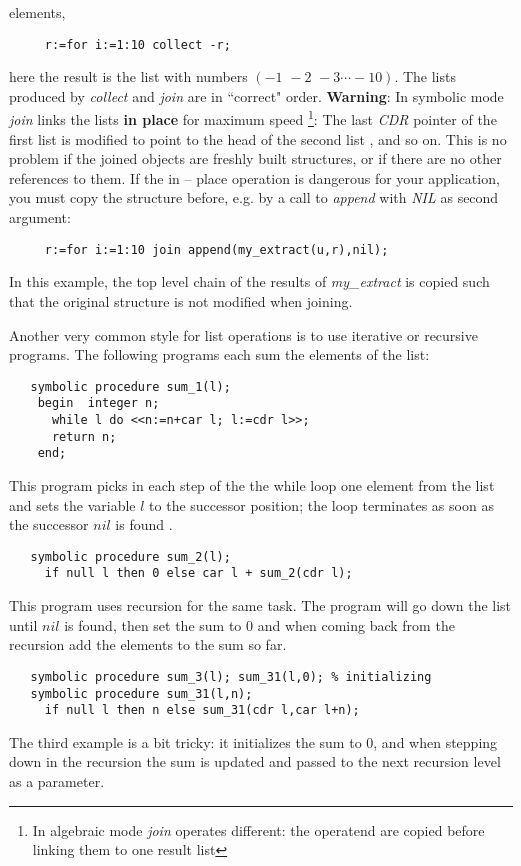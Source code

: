 elements,
\begin{verbatim}
     r:=for i:=1:10 collect -r;
\end{verbatim}
here the result is the list with numbers $(-1\,\, -2\,\, -3 \cdots -10)$.
The lists produced by {\em collect} and {\em join} are in ``correct" 
order.
{\bf Warning}: In symbolic mode  {\em join} links the lists 
{\bf in place} for maximum speed
\footnote{In algebraic mode {\em join} operates different: the operatend
are copied before linking them to one result list}:
The last {\em CDR} pointer  of the first list is modified to 
point to the head of the second list , and so on.
This is no problem if the joined objects are freshly built
structures, or if there are no other references to them.
If the in -- place operation is dangerous for your application,
you must copy the structure before, e.g. by a call to {\em append}
with {\em NIL} as second argument:
\begin{verbatim}
     r:=for i:=1:10 join append(my_extract(u,r),nil);
\end{verbatim}
In this example, the top level chain of the results of {\em my\_extract}
is copied such that the original structure is not modified when
joining.


Another very common style for list operations is to use 
iterative or recursive programs. The following programs each
sum the elements of the list:
\begin{verbatim}
   symbolic procedure sum_1(l);
    begin  integer n;
      while l do <<n:=n+car l; l:=cdr l>>;
      return n;
    end;
\end{verbatim}
This program picks in each step of the the while loop one
element from the list and sets the variable $l$ to
the successor position; the loop terminates as soon as the 
successor $nil$ is found .
\begin{verbatim}
   symbolic procedure sum_2(l);
     if null l then 0 else car l + sum_2(cdr l);
\end{verbatim}
This program uses recursion for the same task.
The program will go down the list until $nil$ is found,
then set the sum to $0$ and when coming back from the
recursion add the elements to the sum so far.
\begin{verbatim}
   symbolic procedure sum_3(l); sum_31(l,0); % initializing
   symbolic procedure sum_31(l,n);
     if null l then n else sum_31(cdr l,car l+n);
\end{verbatim}
The third example is a bit tricky: it initializes
the sum to 0, and when stepping down in the
recursion the sum is updated and passed to the next
recursion level as a parameter.

